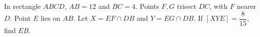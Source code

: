 In rectangle $ABCD$, $AB=12$ and $BC=4$. Points $F,G$ trisect $DC$, with $F$ nearer $D$. Point $E$ lies on $AB$. Let $X=EF\cap DB$ and $Y=EG\cap DB$. If $[XYE]=\dfrac{8}{15}$, find $EB$.
